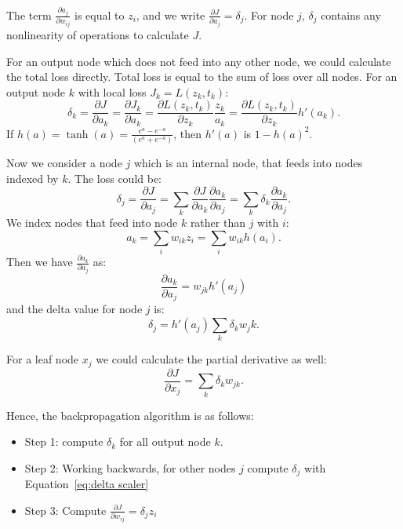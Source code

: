 \documentclass[twoside,12pt]{article}
\begin{document}
The term $\frac{\partial a_j}{\partial w_{ij}}$ is equal to $z_i$, and we write $\frac{\partial J}{\partial a_j}=\delta_j$. For node $j$, $\delta_j$ contains any nonlinearity of operations to calculate $J$. 

For an output node which does not feed into any other node, we could calculate the total loss directly. Total loss is equal to the sum of loss over all nodes.  For an output node $k$ with local loss $J_k=L(z_k,t_k)$:
\begin{equation}
\delta_k=\frac{\partial J}{\partial a_k}=\frac{\partial J_k}{\partial a_k}=\frac{\partial L(z_k,t_k)}{\partial z_k}\frac{z_k}{a_k}=\frac{\partial L(z_k,t_k)}{\partial z_k}h'(a_k). 
\end{equation}
If $h(a)=\tanh(a)=\frac{e^a-e^{-a}}{(e^a+e^{-a})}$, then $h'(a)$ is $1-h(a)^2$.

Now we consider a node $j$ which is an internal node, that feeds into nodes indexed by $k$. The loss could be:
\begin{equation}
\delta_j=\frac{\partial J}{\partial a_j}=\sum_k \frac{\partial J}{\partial a_k}\frac{\partial a_k}{\partial a_j}=\sum_k \delta_k \frac{\partial a_k}{\partial a_j}.
\end{equation}
We index nodes that feed into node $k$ rather than $j$ with $i$:
\begin{equation}
a_k=\sum_i w_{ik}z_i=\sum_i w_{ik}h(a_i).
\end{equation}
Then we have $\frac{\partial a_k}{\partial a_j}$ as:
\begin{equation}
\frac{\partial a_k}{\partial a_j}=w_{jk}h'(a_j)
\end{equation}
and the delta value for node $j$ is:
\begin{equation}
\delta_j = h'(a_j)\sum_k \delta_k w_jk.
\label{eq:delta scaler}
\end{equation}

For a leaf node $x_j$ we could calculate the partial derivative as well:
\begin{equation}
\frac{\partial J}{\partial x_j}=\sum_k \delta_k w_{jk}.
\end{equation}

Hence, the backpropagation algorithm is as follows:
\begin{itemize}
  \item Step 1: compute $\delta_k$ for all output node $k$.
  \item Step 2: Working backwards, for other nodes $j$ compute $\delta_j$ with Equation~\ref{eq:delta scaler}
  \item Step 3: Compute $\frac{\partial J}{\partial w_{ij}}=\delta_j z_i$
  \end{itemize}
\end{document}
